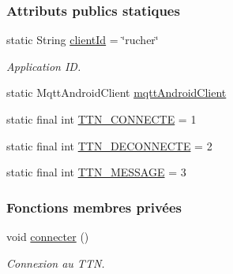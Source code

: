 \subsubsection*{Attributs publics statiques}
\begin{DoxyCompactItemize}
\item 
static String \hyperlink{classcom_1_1example_1_1bee__honeyt_1_1_communication_a8b44e0173d57396d5478f767723c23cc}{client\+Id} = \char`\"{}rucher\char`\"{}
\begin{DoxyCompactList}\small\item\em Application ID. \end{DoxyCompactList}\item 
static Mqtt\+Android\+Client \hyperlink{classcom_1_1example_1_1bee__honeyt_1_1_communication_a86db63a356e4638c1d39c54bbe64f0e1}{mqtt\+Android\+Client}
\item 
static final int \hyperlink{classcom_1_1example_1_1bee__honeyt_1_1_communication_ad8ad53a30dea0bfcc57bad80cb67ab92}{T\+T\+N\+\_\+\+C\+O\+N\+N\+E\+C\+TE} = 1
\item 
static final int \hyperlink{classcom_1_1example_1_1bee__honeyt_1_1_communication_ae2fba68d5f0ed6c8bdbaaae68a4e6192}{T\+T\+N\+\_\+\+D\+E\+C\+O\+N\+N\+E\+C\+TE} = 2
\item 
static final int \hyperlink{classcom_1_1example_1_1bee__honeyt_1_1_communication_aa81848662846946c92ee2b1380669c66}{T\+T\+N\+\_\+\+M\+E\+S\+S\+A\+GE} = 3
\end{DoxyCompactItemize}
\subsubsection*{Fonctions membres privées}
\begin{DoxyCompactItemize}
\item 
void \hyperlink{classcom_1_1example_1_1bee__honeyt_1_1_communication_aadc176b28bce357bf655d0feec024013}{connecter} ()
\begin{DoxyCompactList}\small\item\em Connexion au T\+TN. \end{DoxyCompactList}\end{DoxyCompactItemize}
